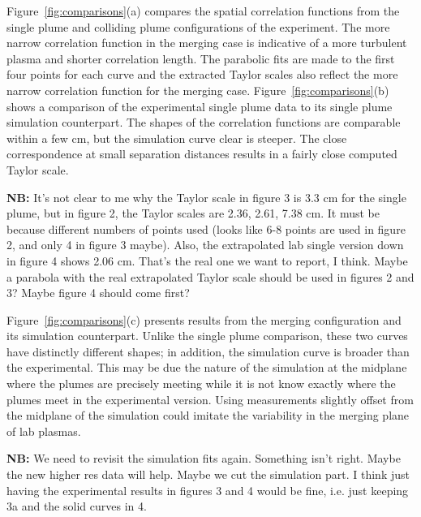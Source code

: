 \documentclass[aip,prl,amsmath,amssymb,reprint,superscriptaddress]{revtex4-1} %
\begin{document}
Figure~\ref{fig:comparisons}(a) compares the spatial correlation functions from the single plume and colliding plume configurations of the experiment. The more narrow correlation function in the merging case is indicative of a more turbulent plasma and shorter correlation length. The parabolic fits are made to the first four points for each curve and the extracted Taylor scales also reflect the more narrow correlation function for  the merging case. Figure~\ref{fig:comparisons}(b) shows a comparison of the experimental single plume data to its single plume simulation counterpart. The shapes of the correlation functions are comparable within a few cm, but the simulation curve clear is steeper. The close correspondence at small separation distances results in a fairly close computed Taylor scale.

{\bf NB:} It's not clear to me why the Taylor scale in figure 3 is 3.3 cm for the single plume, but in figure 2, the Taylor scales are 2.36, 2.61, 7.38 cm.  It must be because different numbers of points used (looks like 6-8 points are used in figure 2, and only 4 in figure 3 maybe).  Also, the extrapolated lab single version down in figure 4 shows 2.06 cm.  That's the real one we want to report, I think.   Maybe a parabola with the real extrapolated Taylor scale should be used in figures 2 and 3?  Maybe figure 4 should come first?

Figure~\ref{fig:comparisons}(c) presents results from the merging configuration and its simulation counterpart. Unlike the single plume comparison, these two curves have distinctly different shapes; in addition, the simulation curve is broader than the experimental. This may be due the nature of the simulation at the midplane where the plumes are precisely meeting while it is not know exactly where the plumes meet in the experimental version. Using measurements slightly offset from the midplane of the simulation could imitate the variability in the merging plane of lab plasmas.

{\bf NB:} We need to revisit the simulation fits again.  Something isn't right.  Maybe the new higher res data will help.  Maybe we cut the simulation part.  I think just having the experimental results in figures 3 and 4 would be fine, i.e. just keeping 3a and the solid curves in 4.
\end{document}
